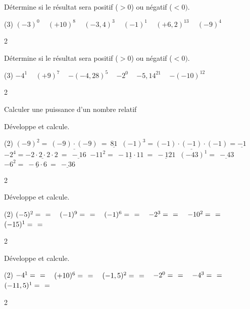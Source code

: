 \documentclass[a4paper,11pt]{report}
\begin{document}
\begin{exop}{
Détermine si le résultat sera positif ($>0$) ou négatif ($<0)$.

\begin{tasks}(3)
    \task $(-3)^0$ \hrulefill~
    \task $(+10)^8$ \hrulefill~
    \task $(-3,4)^3$ \hrulefill~
    \task $(-1)^{1}$ \hrulefill~
    \task $(+6,2)^{13}$ \hrulefill~
    \task $(-9)^4$ \hrulefill~
\end{tasks}
 }{2}
\end{exop}

\begin{exop}{
Détermine si le résultat sera positif ($>0$) ou négatif ($<0)$.

\begin{tasks}(3)
    \task $-4^1$ \hrulefill~
    \task $(+9)^7$ \hrulefill~
    \task $-(-4,28)^5$ \hrulefill~
    \task $-2^0$ \hrulefill~
    \task $-5,14^{21}$ \hrulefill~
    \task $-(-10)^{12}$ \hrulefill~
\end{tasks}
 }{2}
\end{exop}



\begin{resolu}{Calculer une puissance d'un nombre relatif}{
Développe et calcule.
\begin{tasks}(2)
    \task $(-9)^2=\underline{~(-9)\cdot(-9)~}=\underline{~81~}$
    \task $(-1)^3=\underline{(-1)\cdot(-1)\cdot(-1)}=\underline{-1}$
    \task $-2^4=\underline{-2\cdot2\cdot2\cdot2~}=\underline{~-16~}$
    \task $-11^2=\underline{~-11\cdot11~}=\underline{~-121~}$
    \task $(-43)^1=\underline{~-43~}$
    \task $-6^2=\underline{~-6\cdot6~}=\underline{~-36~}$
\end{tasks}  
}{2}
\end{resolu}


\begin{exop}{
Développe et calcule.
\begin{tasks}(2)
    \task $(-5)^2=~\hrulefill~=$ ~
    \task $(-1)^9=~\hrulefill~=$ ~
    \task $(-1)^6=~\hrulefill~=$ ~
    \task $-2^3=~\hrulefill~=$ ~
    \task $-10^2=~\hrulefill~=$ ~
    \task $(-15)^1=~\hrulefill~=$ ~    
\end{tasks}
}{2}
\end{exop}

\begin{exop}{
Développe et calcule.
\begin{tasks}(2)
    \task $-4^1=~\hrulefill~=$ ~
    \task $(+10)^6=~\hrulefill~=$ ~
    \task $(-1,5)^2=~\hrulefill~=$ ~
    \task $-2^0=~\hrulefill~=$ ~
    \task $-4^3=~\hrulefill~=$ ~
    \task $(-11,5)^1=~\hrulefill~=$ ~
\end{tasks}
}{2}
\end{exop}
\end{document}
